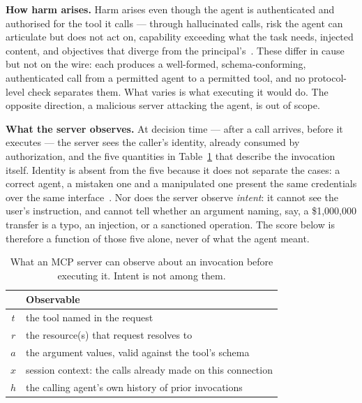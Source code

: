 \textbf{How harm arises.} Harm arises even though the agent is authenticated and
authorised for the tool it calls --- through hallucinated calls, risk the agent
can articulate but does not act on, capability exceeding what the task
needs, injected content, and objectives that diverge from the
principal's~\cite{yin2025reasoningtrap,tang2025riskknowledge,li2025privilege,%
huang2026auditing,zhan2024injecagent,lynch2025misalignment}. These differ in
cause but not on the wire: each produces a well-formed, schema-conforming,
authenticated call from a permitted agent to a permitted tool, and no
protocol-level check separates them. What varies is what executing it would do.
The opposite direction, a malicious server attacking the agent, is out of scope.

\textbf{What the server observes.} At decision time --- after a call arrives,
before it executes --- the server sees the caller's identity, already consumed by
authorization, and the five quantities in Table~\ref{tab:observables} that
describe the invocation itself. Identity is absent from the five because it does
not separate the cases: a correct agent, a mistaken one and a manipulated one
present the same credentials over the same
interface~\cite{huang2026caller,mellafe2026capability}. Nor does the server
observe \emph{intent}: it cannot see the user's instruction, and cannot tell
whether an argument naming, say, a \$1{,}000{,}000 transfer is a typo, an
injection, or a sanctioned operation. The score below is therefore a function of
those five alone, never of what the agent meant.

\begin{table}[t]
  \caption{What an MCP server can observe about an invocation before executing
  it. Intent is not among them.}
  \label{tab:observables}
  \begin{tabular}{@{}cl@{}}
    \toprule
    & Observable \\
    \midrule
    $t$ & the tool named in the request \\
    $r$ & the resource(s) that request resolves to \\
    $a$ & the argument values, valid against the tool's schema \\
    $x$ & session context: the calls already made on this connection \\
    $h$ & the calling agent's own history of prior invocations \\
    \bottomrule
  \end{tabular}
\end{table}

